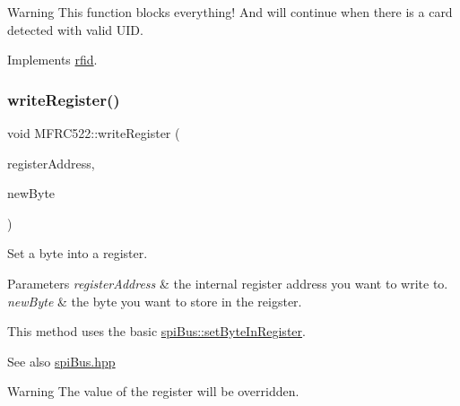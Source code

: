 \begin{DoxyWarning}{Warning}
This function blocks everything! And will continue when there is a card detected with valid U\+ID. 
\end{DoxyWarning}


Implements \mbox{\hyperlink{classrfid_a1b324cb1e7b4c377eca4b3495d4189fd}{rfid}}.

\mbox{\label{class_m_f_r_c522_aa976c78dde5b2dfbbd5bcbedaad14a7a}} 
\subsubsection{\texorpdfstring{write\+Register()}{writeRegister()}\hspace{0.1cm}{\footnotesize\ttfamily [1/2]}}
{\footnotesize\ttfamily void M\+F\+R\+C522\+::write\+Register (\begin{DoxyParamCaption}\item[{\mbox{\hyperlink{class_m_f_r_c522_ae7ec09eb8c9c61288a4770175b4b8db7}{R\+EG}}}]{register\+Address,  }\item[{uint8\+\_\+t}]{new\+Byte }\end{DoxyParamCaption})\hspace{0.3cm}{\ttfamily [protected]}}



Set a byte into a register. 


\begin{DoxyParams}{Parameters}
{\em register\+Address} & the internal register address you want to write to. \\
\hline
{\em new\+Byte} & the byte you want to store in the reigster.\\
\hline
\end{DoxyParams}
This method uses the basic \mbox{\hyperlink{classspi_bus_a3322a039f33a7180a9a57da662607b7d}{spi\+Bus\+::set\+Byte\+In\+Register}}. \begin{DoxySeeAlso}{See also}
\mbox{\hyperlink{spi_bus_8hpp_source}{spi\+Bus.\+hpp}} 
\end{DoxySeeAlso}
\begin{DoxyWarning}{Warning}
The value of the register will be overridden. 
\end{DoxyWarning}
\mbox{\label{class_m_f_r_c522_a3558d379575863072c711721b061bb75}} 
